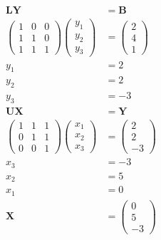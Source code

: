 \documentclass{article}
\begin{document}
\setcounter{subsubsection}{30}
\subsubsection{}

\begin{align*}
  \mathbf{L Y}                  & = \mathbf{B}     \\
  \begin{pmatrix}
    1 & 0 & 0 \\
    1 & 1 & 0 \\
    1 & 1 & 1
  \end{pmatrix} \begin{pmatrix}
                  y_1 \\
                  y_2 \\
                  y_3
                \end{pmatrix} & = \begin{pmatrix}
                                    2 \\
                                    4 \\
                                    1
                                  \end{pmatrix}   \\
  y_1                           & = 2              \\
  y_2                           & = 2              \\
  y_3                           & = -3             \\
  \mathbf{U X}                  & = \mathbf{Y}     \\
  \begin{pmatrix}
    1 & 1 & 1 \\
    0 & 1 & 1 \\
    0 & 0 & 1
  \end{pmatrix} \begin{pmatrix}
                  x_1 \\
                  x_2 \\
                  x_3
                \end{pmatrix} & = \begin{pmatrix}
                                    2 \\
                                    2 \\
                                    -3
                                  \end{pmatrix}   \\
  x_3                           & = -3             \\
  x_2                           & = 5              \\
  x_1                           & = 0              \\
  \mathbf{X}                    & = \begin{pmatrix}
                                      0 \\
                                      5 \\
                                      -3
                                    \end{pmatrix}
\end{align*}
\end{document}
